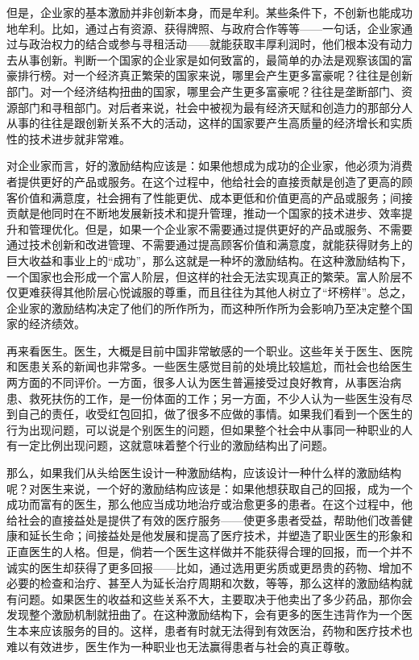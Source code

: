 但是，企业家的基本激励并非创新本身，而是牟利。某些条件下，不创新也能成功地牟利。比如，通过占有资源、获得牌照、与政府合作等等——一句话，企业家通过与政治权力的结合或参与寻租活动——就能获取丰厚利润时，他们根本没有动力去从事创新。判断一个国家的企业家是如何致富的，最简单的办法是观察该国的富豪排行榜。对一个经济真正繁荣的国家来说，哪里会产生更多富豪呢？往往是创新部门。对一个经济结构扭曲的国家，哪里会产生更多富豪呢？往往是垄断部门、资源部门和寻租部门。对后者来说，社会中被视为最有经济天赋和创造力的那部分人从事的往往是跟创新关系不大的活动，这样的国家要产生高质量的经济增长和实质性的技术进步就非常难。

对企业家而言，好的激励结构应该是：如果他想成为成功的企业家，他必须为消费者提供更好的产品或服务。在这个过程中，他给社会的直接贡献是创造了更高的顾客价值和满意度，社会拥有了性能更优、成本更低和价值更高的产品或服务；间接贡献是他同时在不断地发展新技术和提升管理，推动一个国家的技术进步、效率提升和管理优化。但是，如果一个企业家不需要通过提供更好的产品或服务、不需要通过技术创新和改进管理、不需要通过提高顾客价值和满意度，就能获得财务上的巨大收益和事业上的“成功”，那么这就是一种坏的激励结构。在这种激励结构下，一个国家也会形成一个富人阶层，但这样的社会无法实现真正的繁荣。富人阶层不仅更难获得其他阶层心悦诚服的尊重，而且往往为其他人树立了“坏榜样”。总之，企业家的激励结构决定了他们的所作所为，而这种所作所为会影响乃至决定整个国家的经济绩效。

再来看医生。医生，大概是目前中国非常敏感的一个职业。这些年关于医生、医院和医患关系的新闻也非常多。一些医生感觉目前的处境比较尴尬，而社会也给医生两方面的不同评价。一方面，很多人认为医生普遍接受过良好教育，从事医治病患、救死扶伤的工作，是一份体面的工作；另一方面，不少人认为一些医生没有尽到自己的责任，收受红包回扣，做了很多不应做的事情。如果我们看到一个医生的行为出现问题，可以说是个别医生的问题，但如果整个社会中从事同一种职业的人有一定比例出现问题，这就意味着整个行业的激励结构出了问题。

那么，如果我们从头给医生设计一种激励结构，应该设计一种什么样的激励结构呢？对医生来说，一个好的激励结构应该是：如果他想获取自己的回报，成为一个成功而富有的医生，那么他应当成功地治疗或治愈更多的患者。在这个过程中，他给社会的直接益处是提供了有效的医疗服务——使更多患者受益，帮助他们改善健康和延长生命；间接益处是他发展和提高了医疗技术，并塑造了职业医生的形象和正直医生的人格。但是，倘若一个医生这样做并不能获得合理的回报，而一个并不诚实的医生却获得了更多回报——比如，通过选用更劣质或更昂贵的药物、增加不必要的检查和治疗、甚至人为延长治疗周期和次数，等等，那么这样的激励结构就有问题。如果医生的收益和这些关系不大，主要取决于他卖出了多少药品，那你会发现整个激励机制就扭曲了。在这种激励结构下，会有更多的医生违背作为一个医生本来应该服务的目的。这样，患者有时就无法得到有效医治，药物和医疗技术也难以有效进步，医生作为一种职业也无法赢得患者与社会的真正尊敬。

